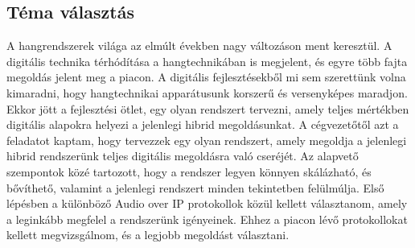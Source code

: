 \subsection{Téma választás}

A hangrendszerek világa az elmúlt években nagy változáson ment keresztül. A digitális technika térhódítása a hangtechnikában is megjelent, és egyre több fajta megoldás jelent meg a piacon.
A digitális fejlesztésekből mi sem szerettünk volna kimaradni, hogy hangtechnikai apparátusunk korszerű és versenyképes maradjon.
Ekkor jött a fejlesztési ötlet, egy olyan rendszert tervezni, amely teljes mértékben digitális alapokra helyezi a jelenlegi hibrid megoldásunkat. A cégvezetőtől azt a feladatot kaptam,
hogy tervezzek egy olyan rendszert, amely megoldja a jelenlegi hibrid rendszerünk teljes digitális megoldásra való cseréjét. 
Az alapvető szempontok közé tartozott, hogy a rendszer legyen könnyen skálázható, és bővíthető, valamint a jelenlegi rendszert minden tekintetben felülmúlja.
Első lépésben a különböző Audio over IP protokollok közül kellett választanom,
amely a leginkább megfelel a rendszerünk igényeinek. Ehhez a piacon lévő protokollokat kellett megvizsgálnom, és a legjobb megoldást választani. 

